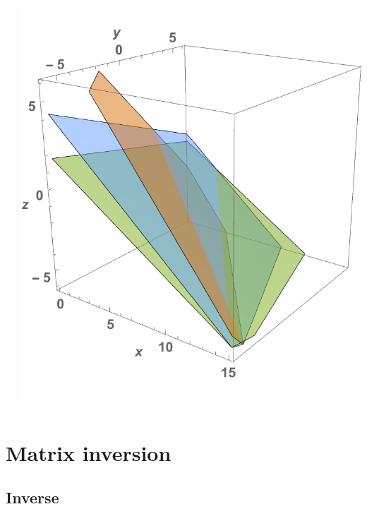 \documentclass[11pt,table,final,xcolor={usenames,dvipsnames,table}]{beamer}
\begin{document}
{\begin{columns}
\begin{itemize}
\[    \]
    \end{itemize}
    \centering\includegraphics[width=\columnwidth]{img/LinearSystem1}
  \end{columns}
}
% 
% 
\section{Matrix inversion}
\subsection*{Inverse}
\end{document}
